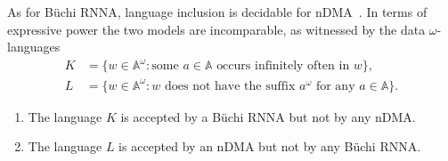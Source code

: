 \documentclass[final,a4paper,UKenglish,thm-restate,autoref,numberwithinsect]{lipics-v2021}
\newcommand{\compr}{:}
\numberwithin{equation}{section}
\newcommand{\+}[1]{\mathcal{#1}\xspace}
\newcommand{\names}{\mathbb{A}}
\theoremstyle{definition}
\begin{document}
As for Büchi RNNA, language inclusion is decidable for
nDMA~\cite[Thm. 4]{CianciaSammartino14}. In terms of expressive power the two models
are incomparable, as witnessed by the data $\omega$-languages
\begin{align*}
K &= \{ w\in \names^\omega\compr \text{some $a\in \names$ occurs  infinitely often in $w$} \},\\
L & =\{ w\in \names^\omega\compr \text{$w$ does not have  the suffix
        $a^\omega$ for any $a\in \names$} \}.
\end{align*}
\vspace{-0.6cm}
\begin{proposition}
  \begin{enumerate}
  \item The language $K$ is accepted by a Büchi RNNA but not by any nDMA.
    
  \item The language $L$ is accepted by an nDMA but not by any Büchi RNNA.
  \end{enumerate}
\end{proposition}
%
\end{document}
